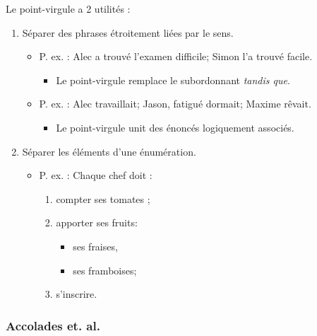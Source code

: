 \documentclass[10pt, french]{article}
\begin{document}
\begin{multicols*}{2}
\begin{definitionNOHFILLprop}
Le point-virgule a 2 utilités : 
\begin{enumerate}
	\item	Séparer des phrases étroitement liées par le sens.
		\begin{itemize}
		\item	P. ex. : Alec a trouvé l'examen difficile; Simon l'a trouvé facile.
			\begin{itemize}
			\item	Le point-virgule remplace le subordonnant \textit{tandis que}.
			\end{itemize}
		\item	P. ex. : Alec travaillait; Jason, fatigué dormait; Maxime rêvait.
		\begin{itemize}
			\item	Le point-virgule unit des énoncés logiquement associés.
		\end{itemize}
		\end{itemize}
	\item	Séparer les éléments d'une énumération.
	\begin{itemize}
	\item	P. ex. : Chaque chef doit : 
		\begin{enumerate}
		\item	compter ses tomates ;
		\item	apporter ses fruits: 
			\begin{itemize}
			\item	ses fraises,
			\item	ses framboises;
			\end{itemize}
		\item	s'inscrire.
		\end{enumerate}
	\end{itemize}
\end{enumerate}
\end{definitionNOHFILLprop}

\begin{definitionNOHFILLprop}

\end{definitionNOHFILLprop}

\subsubsection{Accolades et. al.}

\begin{definitionNOHFILLprop}


\end{definitionNOHFILLprop}
\end{multicols*}
\end{document}
